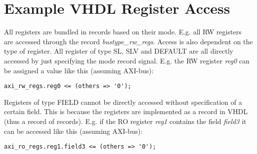 \documentclass{article}
\begin{document}
\section{Example VHDL Register Access}

\par
All registers are bundled in records based on their mode. E.g. all RW registers are accessed through the record \textit{bustype\_rw\_regs}. Access is also dependent on the type of register. All register of type SL, SLV and DEFAULT are all directly accessed by just specifying the mode record signal. E.g. the RW register \textit{reg0} can be assigned a value like this (assuming AXI-bus):

\begin{lstlisting}[style=vhdl]
axi_rw_regs.reg0 <= (others => '0');
\end{lstlisting}

\par Registers of type FIELD cannot be directly accessed without specification of a certain field. This is because the registers are implemented as a record in VHDL (thus a record of records). E.g. if the RO register \textit{reg1} contains the field \textit{field3} it can be accessed like this (assuming AXI-bus):

\begin{lstlisting}[style=vhdl]
axi_ro_regs.reg1.field3 <= (others => '0');
\end{lstlisting}
\end{document}

